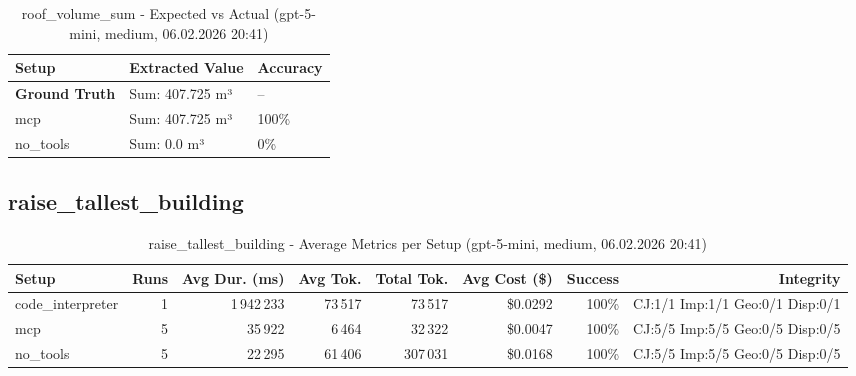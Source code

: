 \documentclass[a4paper,11pt]{article}
\begin{document}
\begin{table}[H]
\centering
\scriptsize
\caption{roof\_volume\_sum - Expected vs Actual (gpt-5-mini, medium, 06.02.2026 20:41)}
\begin{tabular}{l l l}
\toprule
Setup & Extracted Value & Accuracy \\
\midrule
\textbf{Ground Truth} & Sum: 407.725 m³ & -- \\
\midrule
mcp & Sum: 407.725 m³ & 100\% \\
no\_tools & Sum: 0.0 m³ & 0\% \\
\bottomrule
\end{tabular}
\end{table}

\clearpage

\subsection{raise\_tallest\_building}

\begin{table}[H]
\centering
\scriptsize
\caption{raise\_tallest\_building - Average Metrics per Setup (gpt-5-mini, medium, 06.02.2026 20:41)}
\label{tab:combined\_raise\_tallest\_building\_metrics\_20260206}
\begin{tabular}{l r r r r r r r}
\toprule
Setup & Runs & Avg Dur. (ms) & Avg Tok. & Total Tok. & Avg Cost (\$) & Success & Integrity \\
\midrule
code\_interpreter & 1 & 1\,942\,233 & 73\,517 & 73\,517 & \$0.0292 & 100\% & CJ:1/1 Imp:1/1 Geo:0/1 Disp:0/1 \\
mcp & 5 & 35\,922 & 6\,464 & 32\,322 & \$0.0047 & 100\% & CJ:5/5 Imp:5/5 Geo:0/5 Disp:0/5 \\
no\_tools & 5 & 22\,295 & 61\,406 & 307\,031 & \$0.0168 & 100\% & CJ:5/5 Imp:5/5 Geo:0/5 Disp:0/5 \\
\bottomrule
\end{tabular}
\end{table}
\end{document}
